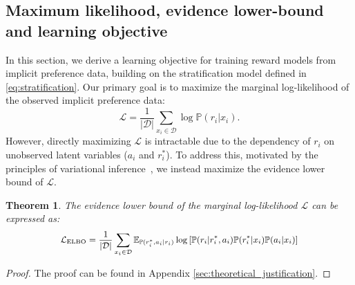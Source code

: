 \documentclass[]{arxiv_singlecolumn}
\theoremstyle{plain}
\newtheorem{theorem}{Theorem}[section]
\theoremstyle{definition}
\theoremstyle{remark}
\begin{document}
\subsection{Maximum likelihood, evidence lower-bound and learning objective}
In this section, we derive a learning objective for training reward models from implicit preference data, building on the stratification model defined in \eqref{eq:stratification}. Our primary goal is to maximize the marginal log-likelihood of the observed implicit preference data:
\begin{equation}
    \mathcal{L}=\frac{1}{|\mathcal{D}|} \sum_{x_i\in\mathcal{D}} \log \mathbb{P}(r_i|x_i).
\end{equation}
However, directly maximizing $\mathcal{L}$ is intractable due to the dependency of $r_i$ on unobserved latent variables ($a_i$ and $r^*_i$). To address this, motivated by the principles of variational inference~\citep{visurvey,prml,Recrec}, we instead maximize the evidence lower bound of $\mathcal{L}$.

\begin{theorem}\label{thm:elbomain}
    The evidence lower bound of the marginal log-likelihood $\mathcal{L}$ can be expressed as:
    \begin{equation}\small
    \begin{aligned}
        \mathcal{L}_\mathrm{ELBO}=\frac{1}{|\mathcal{D}|} \sum_{x_i\in\mathcal{D}} \mathbb{E}_{\mathbb{P}(r^*_i,a_i|r_i)} \log\left[\mathbb{P}(r_i|r^*_i,a_i)\mathbb{P}(r^*_i|x_i)\mathbb{P}(a_i|x_i)\right]
    \end{aligned}
    \end{equation}
\end{theorem}
\begin{proof}
    The proof can be found in Appendix \ref{sec:theoretical_justification}.
\end{proof}
\end{document}
